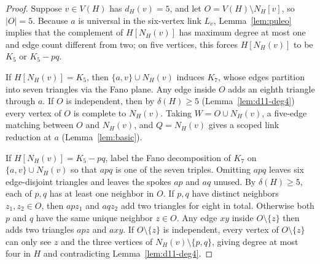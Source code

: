 \documentclass[11pt]{article}
\begin{document}
\begin{proof}
Suppose $v\in V(H)$ has $d_H(v)=5$, and let $O=V(H)\setminus N_H[v]$, so $|O|=5$. Because $a$ is universal in the six-vertex link $L_v$, Lemma~\ref{lem:puleo} implies that the complement of $H[N_H(v)]$ has maximum degree at most one and edge count different from two; on five vertices, this forces $H[N_H(v)]$ to be $K_5$ or $K_5-pq$.

If $H[N_H(v)]=K_5$, then $\{a,v\}\cup N_H(v)$ induces $K_7$, whose edges partition into seven triangles via the Fano plane. Any edge inside $O$ adds an eighth triangle through $a$. If $O$ is independent, then by $\delta(H)\geq 5$ (Lemma~\ref{lem:d11-deg4}) every vertex of $O$ is complete to $N_H(v)$. Taking $W=O\cup N_H(v)$, a five-edge matching between $O$ and $N_H(v)$, and $Q=N_H(v)$ gives a scoped link reduction at $a$ (Lemma~\ref{lem:basic}).

If $H[N_H(v)]=K_5-pq$, label the Fano decomposition of $K_7$ on $\{a,v\}\cup N_H(v)$ so that $apq$ is one of the seven triples. Omitting $apq$ leaves six edge-disjoint triangles and leaves the spokes $ap$ and $aq$ unused. By $\delta(H)\geq 5$, each of $p,q$ has at least one neighbor in $O$. If $p,q$ have distinct neighbors $z_1,z_2\in O$, then $apz_1$ and $aqz_2$ add two triangles for eight in total. Otherwise both $p$ and $q$ have the same unique neighbor $z\in O$. Any edge $xy$ inside $O\setminus\{z\}$ then adds two triangles $apz$ and $axy$. If $O\setminus\{z\}$ is independent, every vertex of $O\setminus\{z\}$ can only see $z$ and the three vertices of $N_H(v)\setminus\{p,q\}$, giving degree at most four in $H$ and contradicting Lemma~\ref{lem:d11-deg4}.
\end{proof}
\end{document}
